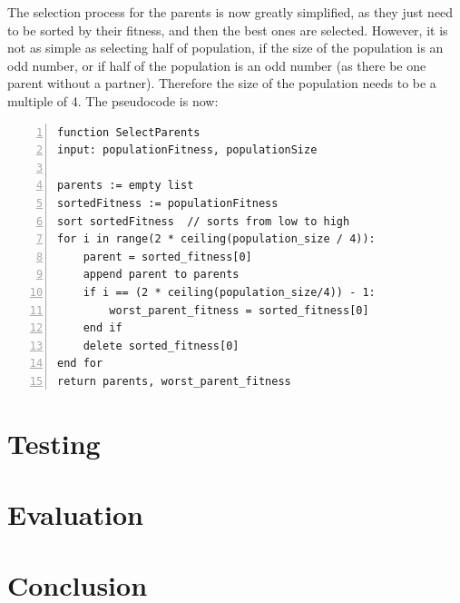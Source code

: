 \documentclass[a4paper, 12pt]{report}
\begin{document}
The selection process for the parents is now greatly simplified, as they just
need to be sorted by their fitness, and then the best ones are selected.
However, it is not as simple as selecting half of population, if the size of the
population is an odd number, or if half of the population is an odd number (as 
there be one parent without a partner).
Therefore the size of the population needs to be a multiple of 4.
The pseudocode is now:

\begin{Verbatim}[numbers=left, fontsize=\footnotesize, tabsize=4]
function SelectParents
input: populationFitness, populationSize

parents := empty list
sortedFitness := populationFitness
sort sortedFitness  // sorts from low to high
for i in range(2 * ceiling(population_size / 4)):
    parent = sorted_fitness[0]
    append parent to parents
    if i == (2 * ceiling(population_size/4)) - 1:
        worst_parent_fitness = sorted_fitness[0]
	end if
    delete sorted_fitness[0]
end for
return parents, worst_parent_fitness
\end{Verbatim}







\chapter{Testing}  %

\chapter{Evaluation}  %

\chapter{Conclusion}  %

\renewcommand\bibname{References}


\appendix
\end{document}
